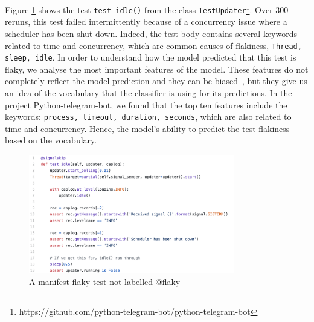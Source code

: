 Figure \ref{manifest-flaky-example} shows the test \texttt{test\_idle()} from the class \texttt{TestUpdater}\footnote{https://github.com/python-telegram-bot/python-telegram-bot}.
Over 300 reruns, this test failed intermittently because of a concurrency issue where a scheduler has been shut down. 
Indeed, the test body contains several keywords related to time and concurrency, which are common causes of flakiness, \eg \texttt{Thread, sleep, idle}. 
In order to understand how the model predicted that this test is flaky, we analyse the most important features of the model. 
These features do not completely reflect the model prediction and they can be biased~\cite{Permutat82:online}, but they give us an idea of the vocabulary that the classifier is using for its predictions.
In the project Python-telegram-bot, we found that the top ten features include the keywords: \texttt{process, timeout, duration, seconds}, which are also related to time and concurrency.
Hence, the model's ability to predict the test flakiness based on the vocabulary.

\begin{figure}[ht]
\centering
\includegraphics[width=0.8\textwidth]{figures/replication/manifestFlakyExample.png}
\caption{A manifest flaky test not labelled @flaky}
\label{manifest-flaky-example}
\end{figure}

